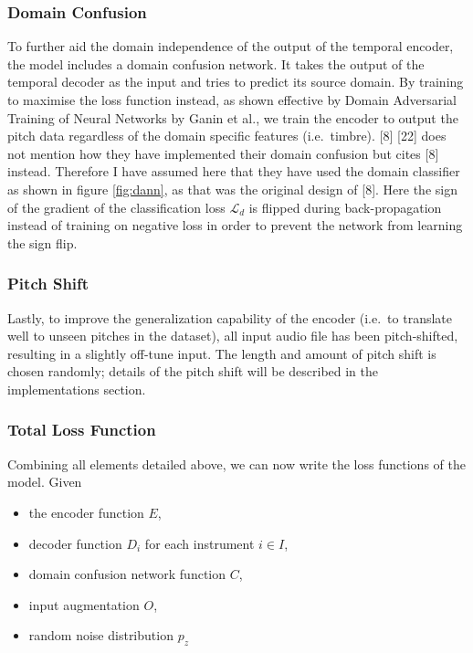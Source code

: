 \documentclass[12pt,a4paper,]{report}
\providecommand{\tightlist}{%
  \setlength{\itemsep}{0pt}\setlength{\parskip}{0pt}}
\begin{document}
\hypertarget{domain-confusion}{%
\subsubsection{Domain Confusion}\label{domain-confusion}}

To further aid the domain independence of the output of the temporal
encoder, the model includes a domain confusion network. It takes the
output of the temporal decoder as the input and tries to predict its
source domain. By training to maximise the loss function instead, as
shown effective by Domain Adversarial Training of Neural Networks by
Ganin et al., we train the encoder to output the pitch data regardless
of the domain specific features (i.e.~timbre). {[}8{]} {[}22{]} does not
mention how they have implemented their domain confusion but cites
{[}8{]} instead. Therefore I have assumed here that they have used the
domain classifier as shown in figure \ref{fig:dann}, as that was the
original design of {[}8{]}. Here the sign of the gradient of the
classification loss \(\mathcal{L}_d\) is flipped during back-propagation
instead of training on negative loss in order to prevent the network
from learning the sign flip.

\hypertarget{pitch-shift}{%
\subsubsection{Pitch Shift}\label{pitch-shift}}

Lastly, to improve the generalization capability of the encoder (i.e.~to
translate well to unseen pitches in the dataset), all input audio file
has been pitch-shifted, resulting in a slightly off-tune input. The
length and amount of pitch shift is chosen randomly; details of the
pitch shift will be described in the implementations section.

\hypertarget{total-loss-function}{%
\subsubsection{Total Loss Function}\label{total-loss-function}}

Combining all elements detailed above, we can now write the loss
functions of the model. Given

\begin{itemize}
\tightlist
\item
  the encoder function \(E\),
\item
  decoder function \(D_i\) for each instrument \(i \in I\),
\item
  domain confusion network function \(C\),
\item
  input augmentation \(O\),
\item
  random noise distribution \(p_z\)
\end{itemize}
\end{document}
